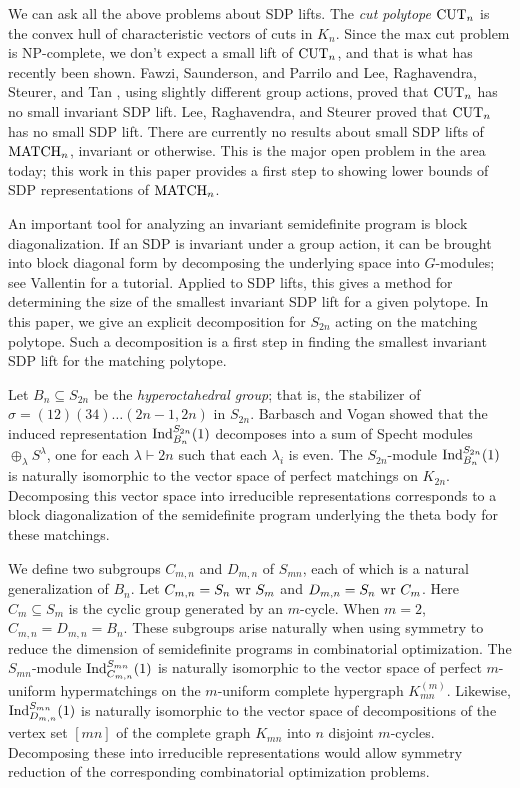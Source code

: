 \documentclass[12pt]{amsart}
\numberwithin{theorem}{section}
\newcommand{\Ind}{\textup{Ind}}
\newcommand{\wreath}{\textup{ wr }}
\newcommand{\MATCH}{\textup{MATCH}}
\newcommand{\CUT}{\textup{CUT}}
\begin{document}
We can ask all the above problems about SDP lifts.
The {\em cut polytope} $\CUT_n$ is the convex hull of characteristic vectors of cuts in $K_{n}$.
Since the max cut problem is NP-complete, we don't expect a small lift of $\CUT_n$, and that is what has recently been shown.
Fawzi, Saunderson, and Parrilo \cite{fawzi2014equivariant} and Lee, Raghavendra, Steurer, and Tan \cite{lee2014power}, using slightly different group actions, proved that $\CUT_n$ has no small invariant SDP lift.
Lee, Raghavendra, and Steurer \cite{lee2014lower} proved that $\CUT_n$ has no small SDP lift.
There are currently no results about small SDP lifts of $\MATCH_n$, invariant or otherwise.
This is the major open problem in the area today; this work in this paper provides a first step to showing lower bounds of SDP representations of $\MATCH_n$.

An important tool for analyzing an invariant semidefinite program is block diagonalization.
If an SDP is invariant under a group action, it can be brought into block diagonal form by decomposing the underlying space into $G$-modules; see Vallentin \cite{vallentin2009symmetry} for a tutorial.
Applied to SDP lifts, this gives a method for determining the size of the smallest invariant SDP lift for a given polytope.
In this paper, we give an explicit decomposition for $S_{2n}$ acting on the matching polytope.
Such a decomposition is a first step in finding the smallest invariant SDP lift for the matching polytope.



Let $B_n \subseteq S_{2n}$ be the {\em hyperoctahedral group}; that is, the stabilizer of $\sigma = (12)(34)\ldots (2n-1,2n)$ in $S_{2n}$.
Barbasch and Vogan \cite{bv} showed that the induced representation $\Ind_{B_n}^{S_{2n}}(1)$ decomposes into a sum of Specht modules $\oplus_\lambda S^\lambda$, one for each $\lambda \vdash 2n$ such that each $\lambda_i$ is even.
The $S_{2n}$-module $\Ind_{B_n}^{S_{2n}}(1)$ is naturally isomorphic to the vector space of perfect matchings on $K_{2n}$.
Decomposing this vector space into irreducible representations corresponds to a block diagonalization of the semidefinite program underlying the theta body for these matchings.

We define two subgroups $C_{m,n}$ and $D_{m,n}$ of $S_{mn}$, each of which is a natural generalization of $B_n$.
Let $C_{m,n} = S_n \wreath S_m$ and $D_{m,n} = S_n \wreath C_m$.
Here $C_m \subseteq S_m$ is the cyclic group generated by an $m$-cycle.
When $m=2$, $C_{m,n} = D_{m,n} = B_n$.
These subgroups arise naturally when using symmetry to reduce the dimension of semidefinite programs in combinatorial optimization.
The $S_{mn}$-module $\Ind_{C_{m,n}}^{S_{mn}}(1)$ is naturally isomorphic to the vector space of perfect $m$-uniform hypermatchings on the $m$-uniform complete hypergraph $K^{(m)}_{mn}$.
Likewise, $\Ind_{D_{m,n}}^{S_{mn}}(1)$ is naturally isomorphic to the vector space of decompositions of the vertex set $[mn]$ of the complete graph $K_{mn}$ into $n$ disjoint $m$-cycles.
Decomposing these into irreducible representations would allow symmetry reduction of the corresponding combinatorial optimization problems.
\end{document}
